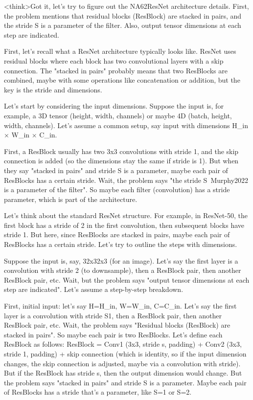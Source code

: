 <think>Got it, let's try to figure out the NA62ResNet architecture details. First, the problem mentions that residual blocks (ResBlock) are stacked in pairs, and the stride S is a parameter of the filter. Also, output tensor dimensions at each step are indicated. 

First, let's recall what a ResNet architecture typically looks like. ResNet uses residual blocks where each block has two convolutional layers with a skip connection. The "stacked in pairs" probably means that two ResBlocks are combined, maybe with some operations like concatenation or addition, but the key is the stride and dimensions.

Let's start by considering the input dimensions. Suppose the input is, for example, a 3D tensor (height, width, channels) or maybe 4D (batch, height, width, channels). Let's assume a common setup, say input with dimensions H_in × W_in × C_in. 

First, a ResBlock usually has two 3x3 convolutions with stride 1, and the skip connection is added (so the dimensions stay the same if stride is 1). But when they say "stacked in pairs" and stride S is a parameter, maybe each pair of ResBlocks has a certain stride. Wait, the problem says "the stride S~Murphy2022 is a parameter of the filter". So maybe each filter (convolution) has a stride parameter, which is part of the architecture.

Let's think about the standard ResNet structure. For example, in ResNet-50, the first block has a stride of 2 in the first convolution, then subsequent blocks have stride 1. But here, since ResBlocks are stacked in pairs, maybe each pair of ResBlocks has a certain stride. Let's try to outline the steps with dimensions.

Suppose the input is, say, 32x32x3 (for an image). Let's say the first layer is a convolution with stride 2 (to downsample), then a ResBlock pair, then another ResBlock pair, etc. Wait, but the problem says "output tensor dimensions at each step are indicated". Let's assume a step-by-step breakdown.

First, initial input: let's say H=H_in, W=W_in, C=C_in. Let's say the first layer is a convolution with stride S1, then a ResBlock pair, then another ResBlock pair, etc. Wait, the problem says "Residual blocks (ResBlock) are stacked in pairs". So maybe each pair is two ResBlocks. Let's define each ResBlock as follows: ResBlock = Conv1 (3x3, stride s, padding) + Conv2 (3x3, stride 1, padding) + skip connection (which is identity, so if the input dimension changes, the skip connection is adjusted, maybe via a convolution with stride). But if the ResBlock has stride s, then the output dimension would change. But the problem says "stacked in pairs" and stride S is a parameter. Maybe each pair of ResBlocks has a stride that's a parameter, like S=1 or S=2.

